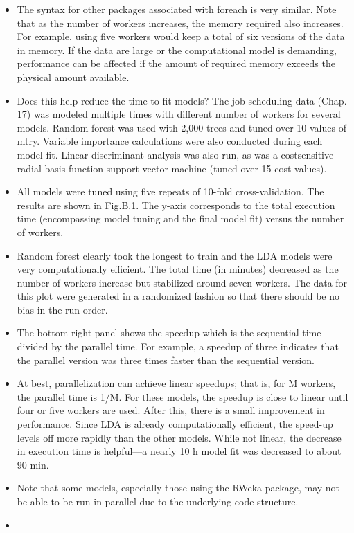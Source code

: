 \documentclass[caret-main.tex]{subfiles}
\begin{document}
\begin{itemize}
\item The syntax for other packages associated with foreach is very similar. Note
that as the number of workers increases, the memory required also increases.
For example, using five workers would keep a total of six versions of the data
in memory. If the data are large or the computational model is demanding,
performance can be affected if the amount of required memory exceeds the
physical amount available.
\item Does this help reduce the time to fit models? The job scheduling data
(Chap. 17) was modeled multiple times with different number of workers for
several models. Random forest was used with 2,000 trees and tuned over 10
values of mtry. Variable importance calculations were also conducted during
each model fit. Linear discriminant analysis was also run, as was a costsensitive
radial basis function support vector machine (tuned over 15 cost
values). 
\item All models were tuned using five repeats of 10-fold cross-validation.
The results are shown in Fig.B.1. The y-axis corresponds to the total execution
time (encompassing model tuning and the final model fit) versus the
number of workers. 
\item Random forest clearly took the longest to train and the
LDA models were very computationally efficient. The total time (in minutes)
decreased as the number of workers increase but stabilized around seven
workers. The data for this plot were generated in a randomized fashion so
that there should be no bias in the run order. 
\item The bottom right panel shows
the speedup which is the sequential time divided by the parallel time. For example,
a speedup of three indicates that the parallel version was three times
faster than the sequential version. 
\item At best, parallelization can achieve linear
speedups; that is, for M workers, the parallel time is 1/M. For these models,
the speedup is close to linear until four or five workers are used. After this,
there is a small improvement in performance. Since LDA is already computationally
efficient, the speed-up levels off more rapidly than the other models.
While not linear, the decrease in execution time is helpful—a nearly 10 h
model fit was decreased to about 90 min.
\item Note that some models, especially those using the RWeka package, may
not be able to be run in parallel due to the underlying code structure.
\item

\end{itemize}
\end{document}
